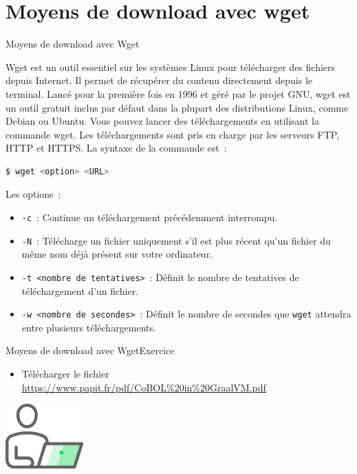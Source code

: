 \documentclass{beamer}
\begin{document}
    \section{Moyens de download avec wget}\label{sec:wget}

    \begin{frame}[fragile]{Moyens de download avec Wget}
        \begin{footnotesize}
            Wget est un outil essentiel sur les systèmes Linux pour télécharger des fichiers depuis Internet.
            Il permet de récupérer du contenu directement depuis le terminal.
            Lancé pour la première fois en 1996 et géré par le projet GNU, wget est un outil gratuit inclus par défaut dans la plupart des distributions Linux, comme Debian ou Ubuntu.
            Vous pouvez lancer des téléchargements en utilisant la commande wget.
            Les téléchargements sont pris en charge par les serveurs FTP, HTTP et HTTPS.
            \bigbreak
            La syntaxe de la commande est~:
            \begin{lstlisting}[language=bash]
$ wget <option> <URL>
            \end{lstlisting}
            Les options~:
            \begin{itemize}
                \item \lstinline{-c}~: Continue un téléchargement précédemment interrompu.
                \item \lstinline{-N}~: Télécharge un fichier uniquement s'il est plus récent qu'un fichier du même nom déjà présent sur votre ordinateur.
                \item \lstinline{-t <nombre de tentatives>}~: Définit le nombre de tentatives de téléchargement d'un fichier.
                \item \lstinline{-w <nombre de secondes>}~: Définit le nombre de secondes que \lstinline{wget} attendra entre plusieurs téléchargements.
            \end{itemize}
        \end{footnotesize}
    \end{frame}

    \begin{frame}{Moyens de download avec Wget}{Exercice \execcounterdispinc}
        \begin{itemize}
            \item Télécharger le fichier \url{https://www.papit.fr/pdf/CoBOL\%20in\%20GraalVM.pdf}
        \end{itemize}
        \bigbreak
        \centering
        \includegraphics[width=3cm]{image/guy-in-front-of-desktop}
    \end{frame}
\end{document}
